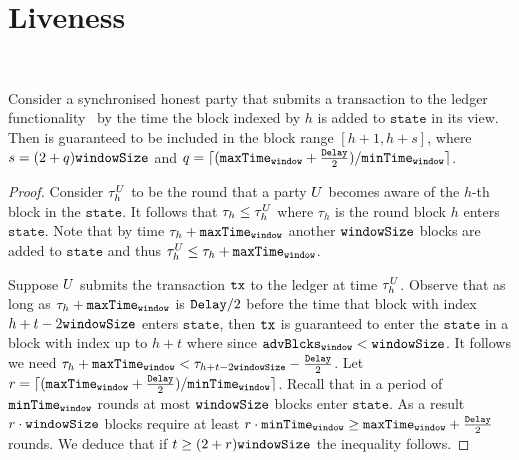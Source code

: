 \section{Liveness} \ \\
\label{sec:liveness}

\begin{proposition}
  \label{prop:liveness}
  Consider a synchronised honest party that submits a transaction \tx to the
  ledger functionality~\cite{genesis} by the time the block indexed by $h$ is
  added to $\texttt{state}$ in its view. Then \tx is guaranteed to be included
  in the block range $[h+1, h + s]$, where $s = (2 + q) \texttt{windowSize}$ and $q = \lceil
  (\texttt{maxTime}_\texttt{window} + \frac{\texttt{Delay}}{2})/ \texttt{minTime}_\texttt{window} \rceil$.
\end{proposition}

\begin{proof}
  Consider $\tau^{U}_h$ to be the round that a party $U$ becomes aware
  of the $h$-th block in the $\texttt{state}$. It follows that $\tau_h \leq
  \tau^{U}_h$ where $\tau_h$ is the round block $h$ enters $\texttt{state}$. Note
  that by time $\tau_h + \texttt{maxTime}_\texttt{window}$ another $\texttt{windowSize}$ blocks are added to
  $\texttt{state}$ and thus $\tau^{U}_h \leq \tau_h + \texttt{maxTime}_\texttt{window}$.

  Suppose $U$ submits the transaction $\texttt{tx}$ to the ledger at time
  $\tau^{U}_h$. Observe that as long as $\tau_h + \texttt{maxTime}_\texttt{window}$ is $\texttt{Delay}/2$
  before the time that block with index $h + t - 2\texttt{windowSize}$ enters $\texttt{state}$,
  then $\texttt{tx}$ is guaranteed to enter the $\texttt{state}$ in a block with index up to $h
  + t$ where since $\texttt{advBlcks}_\texttt{window} < \texttt{windowSize}$. It follows we need
  $\tau_h + \texttt{maxTime}_\texttt{window} < \tau_{h + t - 2\texttt{windowSize}} - \frac{\texttt{Delay}}{2}$. Let $r
  = \lceil (\texttt{maxTime}_\texttt{window} + \frac{\texttt{Delay}}{2})/ \texttt{minTime}_\texttt{window} \rceil$. Recall that in a
  period of $\texttt{minTime}_\texttt{window}$ rounds at most $\texttt{windowSize}$ blocks enter $\texttt{state}$. As a
  result $r \cdot \texttt{windowSize}$ blocks require at least $r \cdot \texttt{minTime}_\texttt{window} \geq
  \texttt{maxTime}_\texttt{window} + \frac{\texttt{Delay}}{2}$ rounds. We deduce that if $t \geq (2 +
  r)\texttt{windowSize}$ the inequality follows.
\end{proof}
